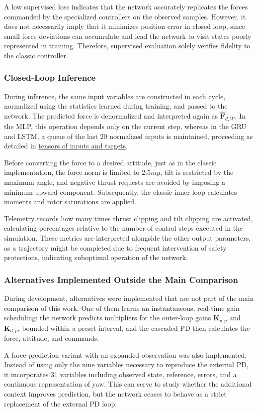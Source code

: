 A low supervised loss indicates that the network accurately replicates the forces commanded by the specialized controllers on the observed samples. However, it does not necessarily imply that it minimizes position error in closed loop, since small force deviations can accumulate and lead the network to visit states poorly represented in training. Therefore, supervised evaluation solely verifies fidelity to the classic controller.

\subsubsection*{Closed-Loop Inference}

During inference, the same input variables are constructed in each cycle, normalized using the statistics learned during training, and passed to the network. The predicted force is denormalized and interpreted again as $\widehat{\bm{F}}_{d,W}$. In the MLP, this operation depends only on the current step, whereas in the GRU and LSTM, a queue of the last 20 normalized inputs is maintained, proceeding as detailed in \hyperref[subsubsec:tensores-entradas-objetivos]{tensors of inputs and targets}.

Before converting the force to a desired attitude, just as in the classic implementation, the force norm is limited to $2.5mg$, tilt is restricted by the maximum angle, and negative thrust requests are avoided by imposing a minimum upward component. Subsequently, the classic inner loop calculates moments and rotor saturations are applied.

Telemetry records how many times thrust clipping and tilt clipping are activated, calculating percentages relative to the number of control steps executed in the simulation. These metrics are interpreted alongside the other output parameters, as a trajectory might be completed due to frequent intervention of safety protections, indicating suboptimal operation of the network.

\subsubsection*{Alternatives Implemented Outside the Main Comparison}

During development, alternatives were implemented that are not part of the main comparison of this work. One of them learns an instantaneous, real-time gain scheduling: the network predicts multipliers for the outer-loop gains $\bm{K}_{p,p}$ and $\bm{K}_{d,p}$, bounded within a preset interval, and the cascaded PD then calculates the force, attitude, and commands.

A force-prediction variant with an expanded observation was also implemented. Instead of using only the nine variables necessary to reproduce the external PD, it incorporates 31 variables including observed state, reference, errors, and a continuous representation of yaw. This can serve to study whether the additional context improves prediction, but the network ceases to behave as a strict replacement of the external PD loop.
